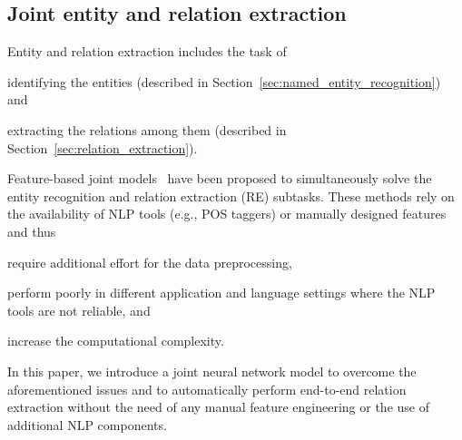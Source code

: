 \documentclass[review]{elsarticle}
\newcommand{\eg}{e.g., }
\newcommand{\secref}[1]{Section~\ref{#1}}
\begin{document}
\subsection{Joint entity and relation extraction}
\label{sec:ent_rel_ext}
\noindent Entity and relation extraction includes the task of 
\begin{enumerate*}[label=(\roman*)]
\item identifying the entities (described in \secref{sec:named_entity_recognition}) and
\item extracting the relations among them (described in \secref{sec:relation_extraction}).
\end{enumerate*}
Feature-based joint models~\citep{kate:10,yang:13,li:14,miwa:14} have been proposed to simultaneously solve the entity recognition and relation extraction (RE) subtasks. These methods rely on the availability of NLP tools (\eg POS taggers) or manually designed features and thus 
\begin{enumerate*}[label=(\roman*)]
\item require additional effort for the data preprocessing,
\item perform poorly in different application and language settings where the NLP tools are not reliable, and
\item increase the computational complexity.
\end{enumerate*}
In this paper, we introduce a joint neural network model to overcome the aforementioned issues and to automatically perform end-to-end relation extraction without the need of any manual feature engineering or the use of additional NLP components.
\end{document}
